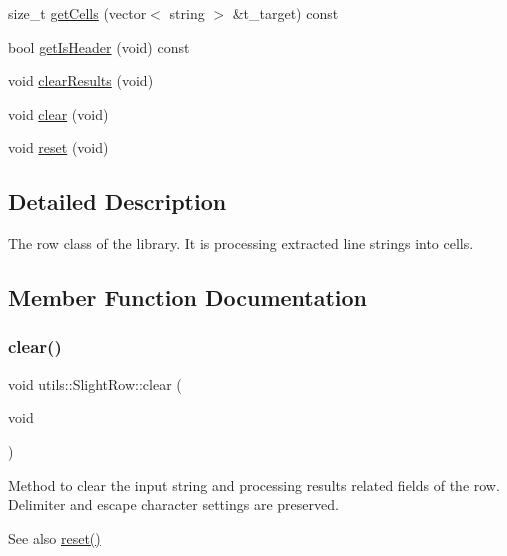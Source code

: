 \begin{DoxyCompactItemize}
\item 
size\+\_\+t \hyperlink{classutils_1_1SlightRow_ab06e2a27035951ff80edf834b430c829}{get\+Cells} (vector$<$ string $>$ \&t\+\_\+target) const
\item 
bool \hyperlink{classutils_1_1SlightRow_a702f97c32ea40303cd83a540404a6eca}{get\+Is\+Header} (void) const
\item 
void \hyperlink{classutils_1_1SlightRow_a44da66b6403cde8ccca9a87cb253ef08}{clear\+Results} (void)
\item 
void \hyperlink{classutils_1_1SlightRow_abd5fa1b875373906c801611a9e051c31}{clear} (void)
\item 
void \hyperlink{classutils_1_1SlightRow_ad323829080b35608b2e5764ed735d4dc}{reset} (void)
\end{DoxyCompactItemize}


\subsection{Detailed Description}
The row class of the library. It is processing extracted line strings into cells. 

\subsection{Member Function Documentation}
\mbox{\label{classutils_1_1SlightRow_abd5fa1b875373906c801611a9e051c31}} 
\subsubsection{\texorpdfstring{clear()}{clear()}}
{\footnotesize\ttfamily void utils\+::\+Slight\+Row\+::clear (\begin{DoxyParamCaption}\item[{void}]{ }\end{DoxyParamCaption})}

Method to clear the input string and processing results related fields of the row. Delimiter and escape character settings are preserved. \begin{DoxySeeAlso}{See also}
\hyperlink{classutils_1_1SlightRow_ad323829080b35608b2e5764ed735d4dc}{reset()} 
\end{DoxySeeAlso}
\mbox{\label{classutils_1_1SlightRow_a44da66b6403cde8ccca9a87cb253ef08}} 
